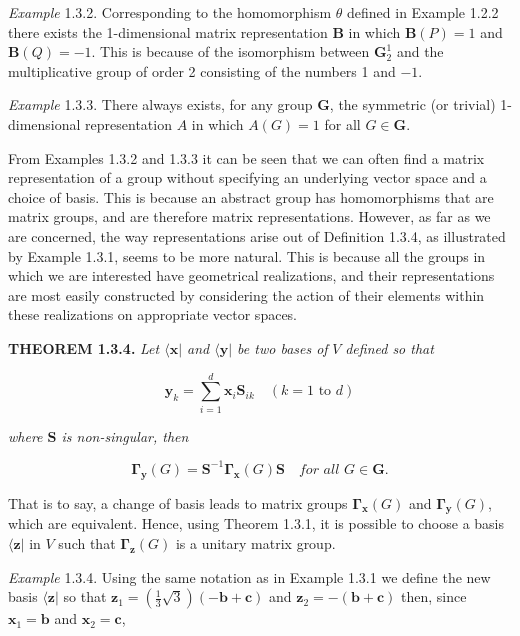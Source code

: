 \documentclass[11pt,a4paper,twoside,openright]{book}
\begin{document}
\textit{Example} 1.3.2. Corresponding to the homomorphism $\theta$ defined in Example 1.2.2 there exists the 1-dimensional matrix representation $\mathbf{B}$ in which $\mathbf{B}(P) = 1$ and $\mathbf{B}(Q) = -1$. This is because of the isomorphism between $\mathbf{G}_2^1$ and the multiplicative group of order 2 consisting of the numbers 1 and $-1$.

\textit{Example} 1.3.3. There always exists, for any group $\mathbf{G}$, the symmetric (or trivial) 1-dimensional representation $A$ in which $A(G) = 1$ for all $G \in \mathbf{G}$.

From Examples 1.3.2 and 1.3.3 it can be seen that we can often find a matrix representation of a group without specifying an underlying vector space and a choice of basis. This is because an abstract group has homomorphisms that are matrix groups, and are therefore matrix representations. However, as far as we are concerned, the way representations arise out of Definition 1.3.4, as illustrated by Example 1.3.1, seems to be more natural. This is because all the groups in which we are interested have geometrical realizations, and their representations are most easily constructed by considering the action of their elements within these realizations on appropriate vector spaces.

\textbf{THEOREM 1.3.4.} \textit{Let $\langle \mathbf{x}|$ and $\langle \mathbf{y}|$ be two bases of} $V$ \textit{defined so that}

\begin{equation*}
\mathbf{y}_{k} = \sum_{i=1}^{d} \mathbf{x}_{i}\mathbf{S}_{ik} \quad (k = 1 \text{ to } d) \tag{1.3.4}
\end{equation*}

\textit{where $\mathbf{S}$ is non-singular, then}

\begin{equation*}
\boldsymbol{\Gamma}_{\mathbf{y}}(G) = \mathbf{S}^{-1}\boldsymbol{\Gamma}_{\mathbf{x}}(G)\mathbf{S} \quad \textit{for all } G \in \mathbf{G}. \tag{1.3.5}
\end{equation*}

That is to say, a change of basis leads to matrix groups $\boldsymbol{\Gamma}_{\mathbf{x}}(G)$ and $\boldsymbol{\Gamma}_{\mathbf{y}}(G)$, which are equivalent. Hence, using Theorem 1.3.1, it is possible to choose a basis $\langle \mathbf{z}|$ in $V$ such that $\boldsymbol{\Gamma}_{\mathbf{z}}(G)$ is a unitary matrix group.

\textit{Example} 1.3.4. Using the same notation as in Example 1.3.1 we define the new basis $\langle \mathbf{z}|$ so that $\mathbf{z}_{1} = \left(\frac{1}{3}\sqrt{3}\right)(-\mathbf{b} + \mathbf{c})$ and $\mathbf{z}_{2} = -(\mathbf{b} + \mathbf{c})$ then, since $\mathbf{x}_{1} = \mathbf{b}$ and $\mathbf{x}_{2} = \mathbf{c}$,
\end{document}
